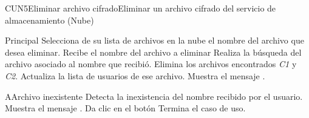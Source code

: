 


\begin{UseCase}{CUN5}{Eliminar archivo cifrado}{Eliminar un archivo cifrado del servicio de almacenamiento (Nube)}

\end{UseCase}


\begin{UCtrayectoria}{Principal}
	\UCpaso [\UCactor] Selecciona de su lista de archivos en la nube el nombre del archivo que desea eliminar.
	\UCpaso Recibe el nombre del archivo a eliminar
	\UCpaso Realiza la búsqueda del archivo asociado al nombre que recibió.  
	\UCpaso Elimina los archivos encontrados \textit{C1} y \textit{C2}.
	\UCpaso Actualiza la lista de usuarios de ese archivo.
	\UCpaso Muestra el mensaje .	
\end{UCtrayectoria}


		
\begin{UCtrayectoriaA}{A}{Archivo inexistente}
	\UCpaso Detecta la inexistencia del nombre recibido por el usuario. 
	\UCpaso  Muestra el mensaje .	
	\UCpaso[\UCactor]  Da clic en el botón \IUbuttonAceptar
	\UCpaso Termina el caso de uso.
\end{UCtrayectoriaA}
